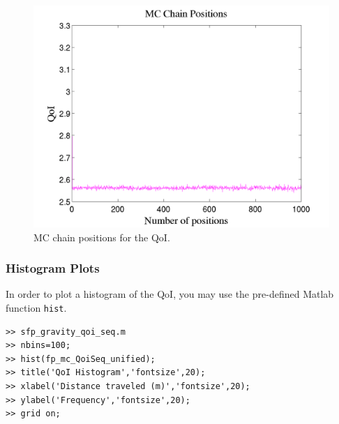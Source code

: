 \begin{figure}[htb]
\centering 
\includegraphics[scale=0.40]{rawfigs/sfp_gravity_chain_pos.png}
\vspace*{-10pt}
\caption{MC chain positions for the QoI.}
\label{fig:sfp_gravity_chain}
\end{figure}

\subsubsection{Histogram Plots}

In order to plot a histogram of the QoI, you may use the pre-defined Matlab function \verb+hist+.
%
\begin{lstlisting}[label=matlab:hist_qoi,caption={Matlab code for the QoI histogram plot.}]
>> sfp_gravity_qoi_seq.m
>> nbins=100;
>> hist(fp_mc_QoiSeq_unified);
>> title('QoI Histogram','fontsize',20);
>> xlabel('Distance traveled (m)','fontsize',20);
>> ylabel('Frequency','fontsize',20);
>> grid on;
\end{lstlisting}

